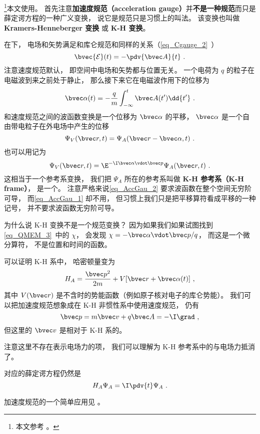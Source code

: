 

\footnote{本文参考 \cite{Bransden}。}本文使用。 首先注意\textbf{加速度规范（acceleration gauge）}并\textbf{不是一种规范}而只是薛定谔方程的一种广义变换， 说它是规范只是习惯上的叫法。 该变换也叫做 \textbf{Kramers-Henneberger 变换} 或 \textbf{K-H 变换}。

在下， 电场和矢势满足和库仑规范和同样的关系（\autoref{eq_Cgauge_2}~）
\begin{equation}\label{eq_AccGau_5}
\bvec {\mathcal{E}}(t) = -\pdv{\bvec A}{t}~.
\end{equation}
注意速度规范默认， 即空间中电场和矢势都与位置无关。 一个电荷为 $q$ 的粒子在电磁波到来之前处于静止， 那么接下来它在电磁波作用下的位移为
\begin{equation}\label{eq_AccGau_3}
\bvec \alpha(t) = -\frac{q}{m}\int_{-\infty}^t \bvec A(t') \dd{t'}~.
\end{equation}
和速度规范之间的波函数变换是一个位移为 $\bvec \alpha$ 的平移， $\bvec \alpha$ 是一个自由带电粒子在外电场中产生的位移
\begin{equation}\label{eq_AccGau_1}
\Psi_V(\bvec r, t) = \Psi_A(\bvec r - \bvec \alpha, t)~.
\end{equation}
也可以用记为
\begin{equation}\label{eq_AccGau_2}
\Psi_V(\bvec r, t) = \E^{-\I \bvec \alpha \vdot \bvec p} \Psi_A(\bvec r, t)~.
\end{equation}
这相当于一个参考系变换， 我们把 $\Psi_A$ 所在的参考系叫做 \textbf{K-H 参考系（K-H frame）}， 是一个。 注意严格来说\autoref{eq_AccGau_2} 要求波函数在整个空间无穷阶可导， 而\autoref{eq_AccGau_1} 却不用， 但习惯上我们只是把平移算符看成平移的一种记号， 并不要求波函数无穷阶可导。

为什么说 K-H 变换不是一个规范变换？ 因为如果我们如果试图找到\autoref{eq_QMEM_3}~中的 $\chi$， 会发现 $\chi = -\bvec \alpha \vdot \bvec p/q$， 而这是一个微分算符， 不是位置和时间的函数。

可以证明 K-H 系中， 哈密顿量变为
\begin{equation}
H_A = \frac{\bvec p^2}{2m} + V[\bvec r + \bvec \alpha(t)]~,
\end{equation}
其中 $V(\bvec r)$ 是不含时的势能函数（例如原子核对电子的库仑势能）。 我们可以把加速度规范想象成在 K-H 非惯性系中使用速度规范， 仍有
\begin{equation}
\bvec p = m\bvec v + q\bvec A = -\I \grad~,
\end{equation}
但这里的 $\bvec v$ 是相对于 K-H 系的。

注意这里不存在表示电场力的项， 我们可以理解为 K-H 参考系中的与电场力抵消了。

对应的薛定谔方程仍然是
\begin{equation}\label{eq_AccGau_4}
H_A \Psi_A = \I \pdv{t} \Psi_A~.
\end{equation}


加速度规范的一个简单应用见 。
